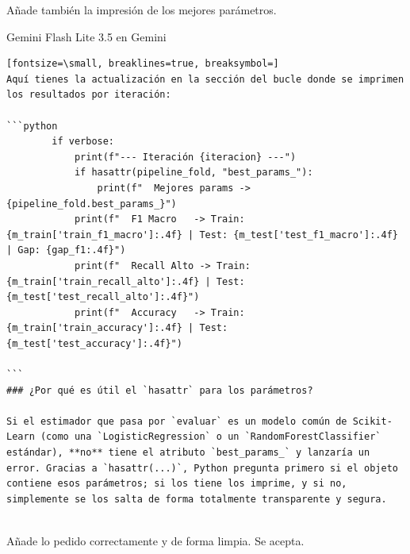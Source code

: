 \documentclass[12pt,a4paper,oneside]{book}
\begin{document}
\begin{iaprompt}
Añade también la impresión de los mejores parámetros.
\end{iaprompt}
\begin{iaresp}{Gemini Flash Lite 3.5 en Gemini}
\begin{Verbatim}[fontsize=\small, breaklines=true, breaksymbol=]
Aquí tienes la actualización en la sección del bucle donde se imprimen los resultados por iteración:

```python
        if verbose:
            print(f"--- Iteración {iteracion} ---")
            if hasattr(pipeline_fold, "best_params_"):
                print(f"  Mejores params -> {pipeline_fold.best_params_}")
            print(f"  F1 Macro   -> Train: {m_train['train_f1_macro']:.4f} | Test: {m_test['test_f1_macro']:.4f} | Gap: {gap_f1:.4f}")
            print(f"  Recall Alto -> Train: {m_train['train_recall_alto']:.4f} | Test: {m_test['test_recall_alto']:.4f}")
            print(f"  Accuracy   -> Train: {m_train['train_accuracy']:.4f} | Test: {m_test['test_accuracy']:.4f}")

```
### ¿Por qué es útil el `hasattr` para los parámetros?

Si el estimador que pasa por `evaluar` es un modelo común de Scikit-Learn (como una `LogisticRegression` o un `RandomForestClassifier` estándar), **no** tiene el atributo `best_params_` y lanzaría un error. Gracias a `hasattr(...)`, Python pregunta primero si el objeto contiene esos parámetros; si los tiene los imprime, y si no, simplemente se los salta de forma totalmente transparente y segura.


\end{Verbatim}
\end{iaresp}
\begin{iaanalisis}
Añade lo pedido correctamente y de forma limpia. Se acepta.
\end{iaanalisis}
\end{document}
